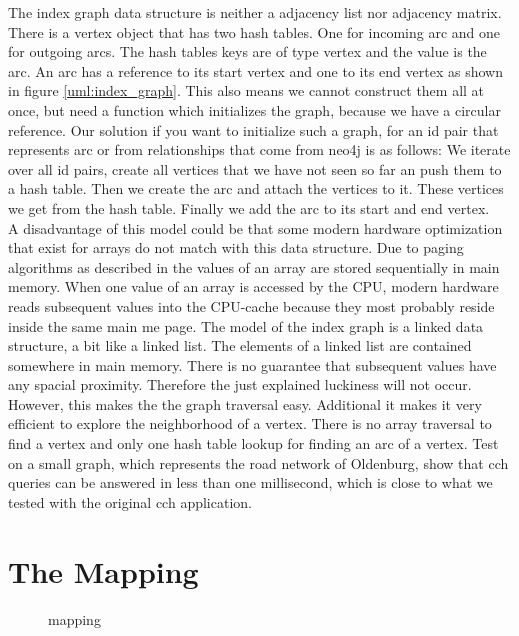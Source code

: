 The index graph data structure is neither a adjacency list nor adjacency matrix.
There is a vertex object that has two hash tables.
One for incoming arc and one for outgoing arcs.
The hash tables keys are of type vertex and the value is the arc.
An arc has a reference to its start vertex and one to its end vertex as shown in figure \ref{uml:index_graph}.
This also means we cannot construct them all at once, but need a function which initializes the graph, because we have a circular reference.
Our solution if you want to initialize such a graph, for an id pair that represents arc or from relationships that come from neo4j is as follows: We iterate over all id pairs, create all vertices that we have not seen so far an push them to a hash table.
Then we create the arc and attach the vertices to it.
These vertices we get from the hash table.
Finally we add the arc to its start and end vertex.
\\
A disadvantage of this model could be that some modern hardware optimization that exist for arrays do not match with this data structure.
Due to paging algorithms as described in \cite[Modern Operatins Systems]{andrew2015modern} the values of an array are stored sequentially in main memory.
When one value of an array is accessed by the CPU, modern hardware reads subsequent values into the CPU-cache because they most probably reside inside the same main me page.
The model of the index graph is a linked data structure, a bit like a linked list.
The elements of a linked list are contained somewhere in main memory.
There is no guarantee that subsequent values have any spacial proximity.
Therefore the just explained luckiness will not occur.
\\ %
However, this makes the the graph traversal easy.
Additional it makes it very efficient to explore the neighborhood of a vertex.
There is no array traversal to find a vertex and only one hash table lookup for finding an arc of a vertex.
Test on a small graph, which represents the road network of Oldenburg, show that cch queries can be answered in less than one millisecond, which is close to what we tested with the original cch application.

\section{The Mapping}\label{sec:mapping}
\begin{figure}
    \centering
    
    \caption{mapping}
    \label{fig:mapping}
\end{figure}

